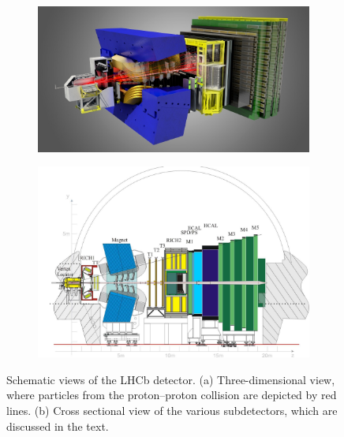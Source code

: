 \begin{figure}[p]
  \centering
  \begin{subfigure}{\textwidth}
    \includegraphics[width=\textwidth]{graphics/intro/detector_3D.jpg}
    \caption{}
    \label{fig:LHCb_3D}
  \end{subfigure}

  \vspace*{0.05\textwidth}
  \begin{subfigure}{\textwidth}
    \includegraphics[width=\textwidth]{graphics/intro/detector_cross}
    \caption{}
    \label{fig:LHCb_cross}
  \end{subfigure}

  \caption{Schematic views of the LHCb detector.
           (a) Three-dimensional view, where particles from the proton--proton collision are depicted by red lines.
           (b) Cross sectional view of the various subdetectors, which are discussed in the text.}
  \label{fig:LHCb}
\end{figure}

